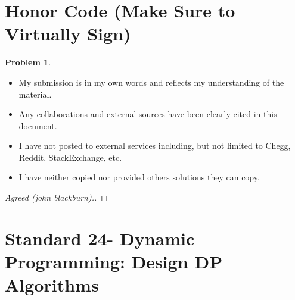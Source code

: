 \documentclass[11pt]{article}
\theoremstyle{definition}
\theoremstyle{definition}
\newtheorem{required}{Problem}
\theoremstyle{definition}
\begin{document}
\section{Honor Code (Make Sure to Virtually Sign)} \label{HonorCode}

\begin{required}
\begin{itemize}
\item My submission is in my own words and reflects my understanding of the material.
\item Any collaborations and external sources have been clearly cited in this document.
\item I have not posted to external services including, but not limited to Chegg, Reddit, StackExchange, etc.
\item I have neither copied nor provided others solutions they can copy.
\end{itemize}

\end{required}

\begin{proof}[Agreed (john blackburn).]
\end{proof}


\newpage
\section{Standard 24- Dynamic Programming: Design DP Algorithms}
\end{document}

